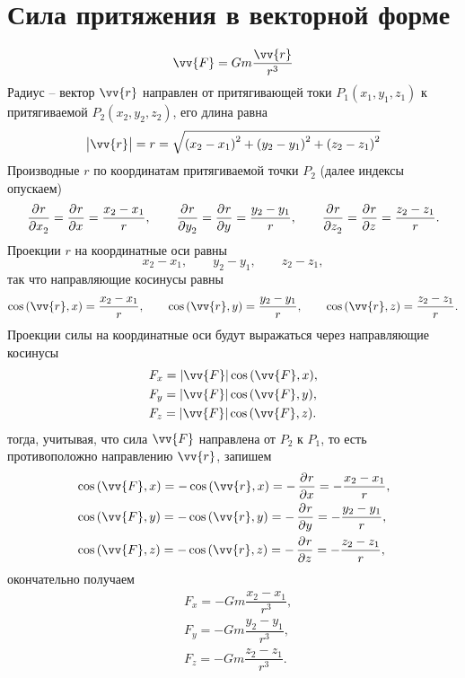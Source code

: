 \documentclass[11pt, a4paper]{article}
\theoremstyle{plain}
\theoremstyle{definition}
\theoremstyle{remark}
\begin{document}
\section{Сила притяжения в векторной форме}
\begin{equation*}
    \vv{F} = Gm\dfrac{\vv{r}}{r^3}
\end{equation*}
Радиус -- вектор $\vv{r}$ направлен от притягивающей токи $P_1 (x_1, y_1, z_1)$ к притягиваемой $P_2
(x_2, y_2, z_2)$, его длина равна
\begin{equation*}
    \left| \vv{r}\right| = r = \sqrt{\left( x_2 - x_1 \right)^2 +
    \left( y_2 - y_1 \right)^2 + \left( z_2 - z_1 \right)^2}
\end{equation*}
Производные $r$ по координатам притягиваемой точки $P_2$ (далее индексы опускаем)
\begin{equation*}
    \dpd{r}{x_2} = \dpd{r}{x} = \dfrac{x_2 - x_1}{r},\qquad
    \dpd{r}{y_2} = \dpd{r}{y} =  \dfrac{y_2 - y_1}{r},\qquad
    \dpd{r}{z_2} = \dpd{r}{z} = \dfrac{z_2 - z_1}{r}. 
\end{equation*}
Проекции $r$ на координатные оси равны
\begin{equation*}
    x_2 - x_1,\qquad y_2 - y_1, \qquad z_2 - z_1,
\end{equation*}
так что направляющие косинусы равны
\begin{equation*}
    \cos{(\vv{r}, x)} = \dfrac{x_2 - x_1}{r},\qquad \cos{(\vv{r}, y)} = \dfrac{y_2 - y_1}{r},\qquad
    \cos{(\vv{r}, z)} = \dfrac{z_2 - z_1}{r}.
\end{equation*}
Проекции силы на координатные оси будут выражаться через направляющие косинусы
\begin{align*}
    & F_x = |\vv{F}|\cos{(\vv{F}, x)}, \\
    & F_y = |\vv{F}|\cos{(\vv{F}, y)}, \\
    & F_z = |\vv{F}|\cos{(\vv{F}, z)}. 
\end{align*}
тогда, учитывая, что сила $\vv{F}$ направлена от $P_2$ к $P_1$, то есть противоположно направлению
$\vv{r}$, запишем
\begin{align*}
    & \cos{(\vv{F}, x)} = -\cos{(\vv{r}, x)} = -\dpd{r}{x} = -\dfrac{x_2 - x_1}{r}, \\
    & \cos{(\vv{F}, y)} = -\cos{(\vv{r}, y)} = -\dpd{r}{y} = -\dfrac{y_2 - y_1}{r}, \\
    & \cos{(\vv{F}, z)} = -\cos{(\vv{r}, z)} = -\dpd{r}{z} = -\dfrac{z_2 - z_1}{r}, 
\end{align*}
окончательно получаем
\begin{align*}
    & F_x = -Gm \dfrac{x_2 - x_1}{r^3}, \\
    & F_y = -Gm \dfrac{y_2 - y_1}{r^3}, \\
    & F_z = -Gm \dfrac{z_2 - z_1}{r^3}. \\
\end{align*}
\end{document}
